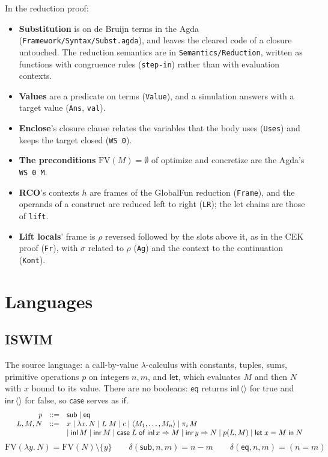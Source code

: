 \documentclass[10pt]{article}
\makeatletter
\theoremstyle{acmplain}
\newcommand{\key}[1]{\mathsf{#1}}
\newcommand{\lam}[1]{\lambda #1.\,}
\newcommand{\Let}{\key{let}\;}
\newcommand{\In}{\;\key{in}\;}
\newcommand{\inl}{\key{inl}\,}
\newcommand{\inr}{\key{inr}\,}
\newcommand{\Case}[5]{\key{case}\;#1\;\key{of}\;\key{inl}\,#2 \Rightarrow #3 \mid \key{inr}\,#4 \Rightarrow #5}
\newcommand{\tuple}[1]{\langle #1 \rangle}
\newcommand{\prj}[1]{\pi_{#1}\,}
\newcommand{\prim}[3]{#1(#2, #3)}
\newcommand{\FV}{\mathrm{FV}}
\newenvironment{syntax}{\[\begin{array}{l@{\quad}rcl}}{\end{array}\]}
\makeatother
\begin{document}
In the reduction proof:
\begin{itemize}
\item \textbf{Substitution} is on de Bruijn terms in the Agda
  (\texttt{Framework/Syntax/Subst.agda}), and leaves the cleared code of a
  closure untouched. The reduction semantics are in
  \texttt{Semantics/Reduction}, written as functions with congruence rules
  (\texttt{step-in}) rather than with evaluation contexts.
\item \textbf{Values} are a predicate on terms (\texttt{Value}), and a
  simulation answers with a target value (\texttt{Ans}, \texttt{val}).
\item \textbf{Enclose}'s closure clause relates the variables that the
  body uses (\texttt{Uses}) and keeps the target closed (\texttt{WS 0}).
\item \textbf{The preconditions} $\FV(M) = \emptyset$ of optimize and
  concretize are the Agda's \texttt{WS 0 M}.
\item \textbf{RCO}'s contexts $h$ are frames of the GlobalFun reduction
  (\texttt{Frame}), and the operands of a construct are reduced left to right
  (\texttt{LR}); the let chains are those of \texttt{lift}.
\item \textbf{Lift locals}' frame is $\rho$ reversed followed by the slots
  above it, as in the CEK proof (\texttt{Fr}), with $\sigma$ related to
  $\rho$ (\texttt{Ag}) and the context to the continuation (\texttt{Kont}).
\end{itemize}

\section{Languages}\label{sec:u-langs}

\subsection{ISWIM}

The source language: a call-by-value $\lambda$-calculus with constants, tuples, sums, primitive operations $p$ on integers $n, m$, and $\key{let}$, which evaluates $M$ and then $N$ with $x$ bound to its value.
There are no booleans: $\key{eq}$ returns $\inl\tuple{}$ for true and $\inr\tuple{}$ for false, so $\key{case}$ serves as $\key{if}$.
\begin{syntax}
  & p &::=& \key{sub} \mid \key{eq} \\
  & L, M, N &::=& x \mid \lam{x} N \mid L\;M \mid c
    \mid \tuple{M_1,\ldots,M_n} \mid \prj{i} M \\
  &&& \mid \inl M \mid \inr M \mid \Case{L}{x}{M}{y}{N} \mid \prim{p}{L}{M}
    \mid \Let x = M \In N
\end{syntax}
\[
  \FV(\lam{y} N) = \FV(N) \setminus \{y\}
  \qquad
  \delta(\key{sub}, n, m) = n - m
  \qquad
  \delta(\key{eq}, n, m) = (n = m)
\]
\end{document}
